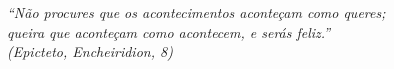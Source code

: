  \begin{epigrafe}
     \vspace*{\fill}
 	\begin{flushright}

        \textit{``Não procures que os acontecimentos aconteçam como queres; \\
        queira que aconteçam como acontecem, e serás feliz.''\\
        (Epicteto, \textit{Encheiridion}, 8)}
 	\end{flushright}
 \end{epigrafe}

